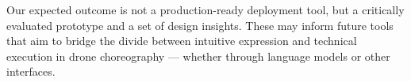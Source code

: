 Our expected outcome is not a production-ready deployment tool, but a critically evaluated prototype and a set of design insights. These may inform future tools that aim to bridge the divide between intuitive expression and technical execution in drone choreography — whether through language models or other interfaces.

